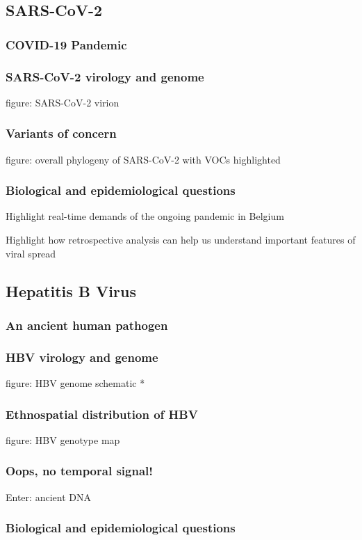     \subsection{SARS-CoV-2}
      \subsubsection{COVID-19 Pandemic}
      \subsubsection{SARS-CoV-2 virology and genome}
      figure: SARS-CoV-2 virion
      \subsubsection{Variants of concern}
      figure: overall phylogeny of SARS-CoV-2 with VOCs highlighted
      \subsubsection{Biological and epidemiological questions}
      Highlight real-time demands of the ongoing pandemic in Belgium

      Highlight how retrospective analysis can help us understand important features of viral spread

    \subsection{Hepatitis B Virus}
      \subsubsection{An ancient human pathogen}
      \subsubsection{HBV virology and genome}
      figure: HBV genome schematic *
      \subsubsection{Ethnospatial distribution of HBV}
      figure: HBV genotype map
      \subsubsection{Oops, no temporal signal!}
      Enter: ancient DNA
      \subsubsection{Biological and epidemiological questions}

